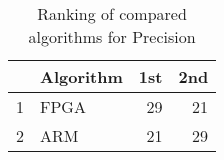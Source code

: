 \begin{table}
\footnotesize
\caption{Ranking of compared algorithms for Precision}
\label{tab:places Precision}
\begin{tabular}{llrr}
\hline
 & Algorithm & 1st & 2nd \\
\hline
1 & FPGA & 29 & 21 \\
2 & ARM & 21 & 29 \\
\hline
\end{tabular}
\end{table}
